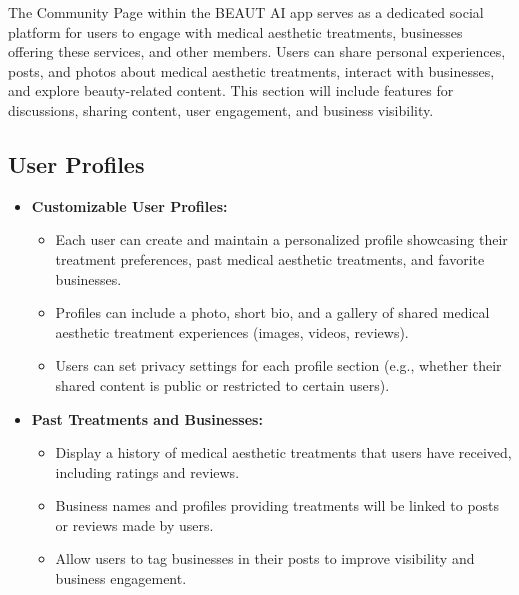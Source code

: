 The Community Page within the BEAUT AI app serves as a dedicated social platform for users to engage with medical aesthetic treatments, businesses offering these services, and other members. Users can share personal experiences, posts, and photos about medical aesthetic treatments, interact with businesses, and explore beauty-related content. This section will include features for discussions, sharing content, user engagement, and business visibility.

\subsection{User Profiles}
\begin{itemize}
    \item \textbf{Customizable User Profiles:}
    \begin{itemize}
        \item Each user can create and maintain a personalized profile showcasing their treatment preferences, past medical aesthetic treatments, and favorite businesses.
        \item Profiles can include a photo, short bio, and a gallery of shared medical aesthetic treatment experiences (images, videos, reviews).
        \item Users can set privacy settings for each profile section (e.g., whether their shared content is public or restricted to certain users).
    \end{itemize}
    
    \item \textbf{Past Treatments and Businesses:}
    \begin{itemize}
        \item Display a history of medical aesthetic treatments that users have received, including ratings and reviews.
        \item Business names and profiles providing treatments will be linked to posts or reviews made by users.
        \item Allow users to tag businesses in their posts to improve visibility and business engagement.
    \end{itemize}
\end{itemize}

